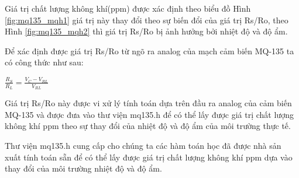 Giá trị chất lượng không khí(ppm) được xác định theo biểu đồ Hình \ref{fig:mq135_mqh1} giá trị này thay đổi theo sự biến đổi của giá trị Rs/Ro, theo Hình \ref{fig:mq135_mqh2} thì giá trị Rs/Ro bị ảnh hưởng bởi nhiệt độ và độ ẩm.

Để xác định được giá trị Rs/Ro từ ngõ ra analog của mạch cảm biến MQ-135 ta có công thức như sau:
\begin{center}
$\displaystyle \frac{R_{S}}{R_{L}} = \frac{V_{C}-V_{RL}}{V_{RL}}$
\end{center}

Giá trị Rs/Ro này được vi xử lý tính toán dựa trên đầu ra analog của cảm biến MQ-135 và được đưa vào thư viện mq135.h để có thể lấy được giá trị chất lượng không khí ppm theo sự thay đổi của nhiệt độ và độ ẩm của môi trường thực tế.

Thư viện mq135.h cung cấp cho chúng ta các hàm toán học đã được nhà sản xuất tính toán sẵn để có thể lấy được giá trị chất lượng không khí ppm dựa vào thay đổi của môi trường nhiệt độ và độ ẩm.



\newpage
